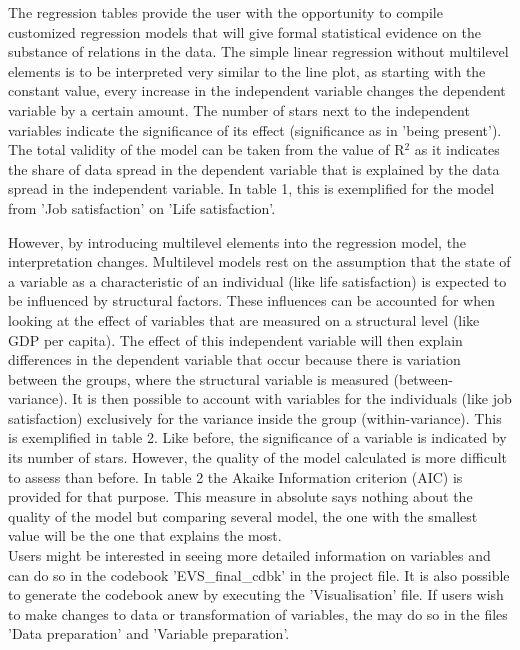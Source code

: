 \documentclass[preprint,12pt,authoryear]{elsarticle}
\begin{document}


The regression tables provide the user with the opportunity to compile customized regression models that will give formal statistical evidence on the substance of relations in the data. The simple linear regression without multilevel elements is to be interpreted very similar to the line plot, as starting with the constant value, every increase in the independent variable changes the dependent variable by a certain amount. The number of stars next to the independent variables indicate the significance of its effect (significance as in 'being present'). The total validity of the model can be taken from the value of R$^2$ as it indicates the share of data spread in the dependent variable that is explained by the data spread in the independent variable. In table 1, this is exemplified for the model from 'Job satisfaction' on 'Life satisfaction'. 



However, by introducing multilevel elements into the regression model, the interpretation changes. Multilevel models rest on the assumption that the state of a variable as a characteristic of an individual (like life satisfaction) is expected to be influenced by structural factors. These influences can be accounted for when looking at the effect of variables that are measured on a structural level (like GDP per capita). The effect of this independent variable will then explain differences in the dependent variable that occur because there is variation between the groups, where the structural variable is measured (between-variance). It is then possible to account with variables for the individuals (like job satisfaction) exclusively for the variance inside the group (within-variance). This is exemplified in table 2. Like before, the significance of a variable is indicated by its number of stars. However, the quality of the model calculated is more difficult to assess than before. In table 2 the Akaike Information criterion (AIC) is provided for that purpose. This measure in absolute says nothing about the quality of the model but comparing several model, the one with the smallest value will be the one that explains the most.\\ 

Users might be interested in seeing more detailed information on variables and can do so in the codebook 'EVS\_final\_cdbk' in the project file. It is also possible to generate the codebook anew by executing the 'Visualisation' file. If users wish to make changes to data or transformation of variables, the may do so in the files 'Data preparation' and 'Variable preparation'.
\end{document}
